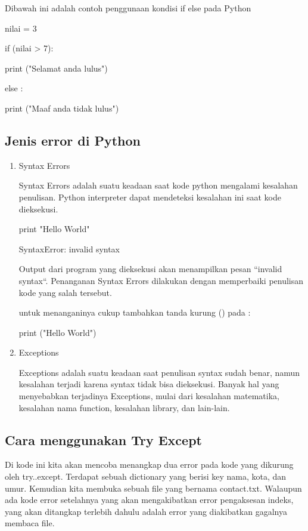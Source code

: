 Dibawah ini adalah contoh penggunaan kondisi if else pada Python

nilai = 3

if (nilai > 7):

	print ("Selamat anda lulus")

else :

	print ("Maaf anda tidak lulus")

\subsection{Jenis error di Python}

\begin{enumerate}
\item Syntax Errors

Syntax Errors adalah suatu keadaan saat kode python mengalami kesalahan penulisan. Python interpreter dapat mendeteksi kesalahan ini saat kode dieksekusi.

print "Hello World"

SyntaxError: invalid syntax

Output dari program yang dieksekusi akan menampilkan pesan “invalid syntax“. Penanganan Syntax Errors dilakukan dengan memperbaiki penulisan kode yang salah tersebut. 

untuk menanganinya cukup tambahkan tanda kurung () pada :

print ("Hello World") 

\item Exceptions

Exceptions adalah suatu keadaan saat penulisan syntax sudah benar, namun kesalahan terjadi karena syntax tidak bisa dieksekusi. Banyak hal yang menyebabkan terjadinya Exceptions, mulai dari kesalahan matematika, kesalahan nama function, kesalahan library, dan lain-lain.
\end{enumerate}

\subsection{Cara menggunakan Try Except}

Di kode ini kita akan mencoba menangkap dua error pada kode yang dikurung oleh try..except. Terdapat sebuah dictionary yang berisi key nama, kota, dan umur. Kemudian kita membuka sebuah file yang bernama contact.txt. Walaupun ada kode error setelahnya yang akan mengakibatkan error pengaksesan indeks, yang akan ditangkap terlebih dahulu adalah error yang diakibatkan gagalnya membaca file.

